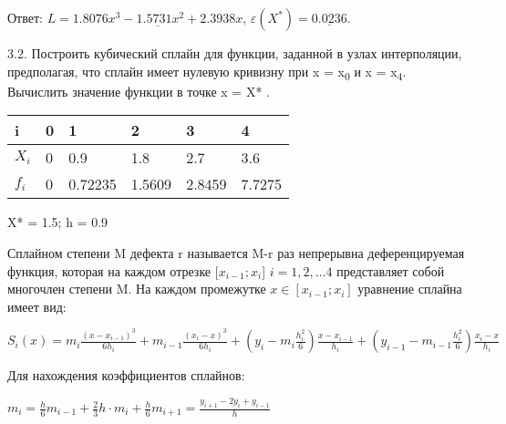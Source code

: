 \documentclass[10pt, a4paper]{scrartcl}
\begin{document}
Ответ: \(L = \underline{1.8076 x^3 - 1.5731 x^2 + 2.3938 x}\),
\(\varepsilon(X^{*}) = \underline{0.0236}\).

\pagebreak

3.2. Построить кубический сплайн для функции, заданной в узлах
интерполяции, предполагая, что сплайн имеет нулевую кривизну при x =
x\textsubscript{0} и x = x\textsubscript{4}. Вычислить значение функции
в точке x = X* .

\begin{center}
\begin{tabular}{ | l  | l  | l  | l  | l  | l |}
\hline
i & 0 & 1 & 2 & 3 & 4 \\ \hline
$X_i$ & 0 & 0.9 & 1.8 & 2.7 & 3.6 \\ \hline
$f_i$ & 0 & 0.72235 & 1.5609 & 2.8459 & 7.7275 \\ \hline
\end{tabular}
\end{center}

X* = 1.5; h = 0.9

\vspace{5mm}

Сплайном степени M дефекта r называется M-r раз непрерывна
деференцируемая функция, которая на каждом отрезке {[}\(x_{i-1};x_i\){]}
\(i=1,2, \dots 4\) представляет собой многочлен степени M. На каждом
промежутке \(x \in [x_{i-1};x_i]\) уравнение сплайна имеет вид:

\(\displaystyle S_i(x) = m_i \frac{(x-x_{i-1})^3}{6h_i} + m_{i-1} \frac{(x_i - x)^3}{6h_i} + (y_i - m_i\frac{h_i^2}{6})\frac{x-x_{i-1}}{h_i} + (y_{i-1} - m_{i-1}\frac{h_i^2}{6})\frac{x_i - x}{h_i}\)

Для нахождения коэффициентов сплайнов:

\(\displaystyle m_i = \frac{h}{6}m_{i-1} + \frac{2}{3}h \cdot m_i + \frac{h}{6}m_{i+1} = \frac{y_{i+1} - 2y_i + y_{i-1}}{h}\)

\vspace{5mm}
\end{document}

